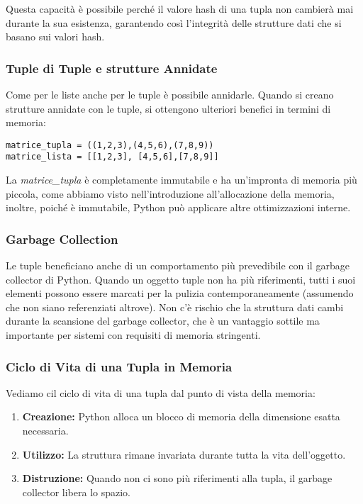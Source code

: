 Questa capacità è possibile perché il valore hash di una tupla non cambierà mai durante la sua esistenza, garantendo così l'integrità delle strutture dati che si basano sui valori hash.


\subsubsection{Tuple di Tuple e strutture Annidate}

Come per le liste anche per le tuple è possibile annidarle. Quando si creano strutture annidate con le tuple, si ottengono ulteriori benefici in termini di memoria:

\begin{lstlisting}
matrice_tupla = ((1,2,3),(4,5,6),(7,8,9))
matrice_lista = [[1,2,3], [4,5,6],[7,8,9]]
\end{lstlisting}

La \textit{matrice\_tupla} è completamente immutabile e ha un'impronta di memoria più piccola, come abbiamo visto nell'introduzione all'allocazione della memoria, inoltre, poiché è immutabile, Python può applicare altre ottimizzazioni interne.


\subsubsection{Garbage Collection}

Le tuple beneficiano anche di un comportamento più prevedibile con il garbage collector di Python. Quando un oggetto tuple non ha più riferimenti, tutti i suoi elementi possono essere marcati per la pulizia contemporaneamente (assumendo che non siano referenziati altrove). Non c'è rischio che la struttura dati cambi durante la scansione del garbage collector, che è un vantaggio sottile ma importante per sistemi con requisiti di memoria stringenti.


\subsubsection{Ciclo di Vita di una Tupla in Memoria}

Vediamo cil ciclo di vita di una tupla dal punto di vista della memoria:

\begin{enumerate}
    \item \textbf{Creazione:} Python alloca un blocco di memoria della dimensione esatta necessaria.
    \item \textbf{Utilizzo:} La struttura rimane invariata durante tutta la vita dell'oggetto.
    \item \textbf{Distruzione:} Quando non ci sono più riferimenti alla tupla, il garbage collector libera lo spazio.
\end{enumerate}

